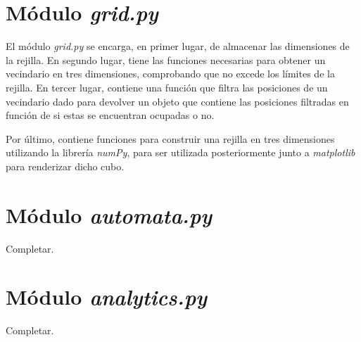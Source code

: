 \section{Módulo \textit{grid.py}}

El módulo \textit{grid.py} se encarga, en primer lugar, de almacenar las dimensiones de la
rejilla. En segundo lugar, tiene las funciones necesarias para obtener un vecindario en
tres dimensiones, comprobando que no excede los límites de la rejilla. En tercer lugar, contiene
una función que filtra las posiciones de un vecindario dado para devolver un objeto que contiene
las posiciones filtradas en función de si estas se encuentran ocupadas o no.

Por último, contiene funciones para construir una rejilla en tres dimensiones utilizando
la librería \textit{numPy}, para ser utilizada posteriormente junto a \textit{matplotlib}
para renderizar dicho cubo.

\section{Módulo \textit{automata.py}}

Completar.

\section{Módulo \textit{analytics.py}}

Completar.
